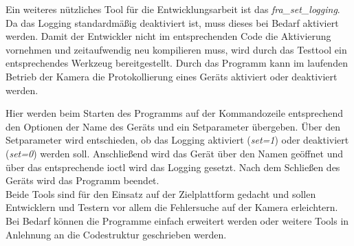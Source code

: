 Ein weiteres nützliches Tool für die Entwicklungsarbeit ist das \textit{fra\_set\_logging}. Da das Logging standardmäßig deaktiviert ist, muss dieses bei Bedarf aktiviert werden. Damit der Entwickler nicht im entsprechenden Code die Aktivierung vornehmen und zeitaufwendig neu kompilieren muss, wird durch das Testtool ein entsprechendes Werkzeug bereitgestellt. Durch das Programm kann im laufenden Betrieb der Kamera die Protokollierung eines Geräts aktiviert oder deaktiviert werden.


Hier werden beim Starten des Programms auf der Kommandozeile entsprechend den Optionen der Name des Geräts und ein Setparameter übergeben. 
Über den Setparameter wird entschieden, ob das Logging aktiviert (\textit{set=1}) oder deaktiviert (\textit{set=0}) werden soll. Anschließend wird das Gerät über den Namen geöffnet und über das entsprechende \ac{ioctl} wird das Logging gesetzt. Nach dem Schließen des Geräts wird das Programm beendet. \\


Beide Tools sind für den Einsatz auf der Zielplattform gedacht und sollen Entwicklern und Testern vor allem die Fehlersuche auf der Kamera erleichtern. Bei Bedarf können die Programme einfach erweitert werden oder weitere Tools in Anlehnung an die Codestruktur geschrieben werden. 